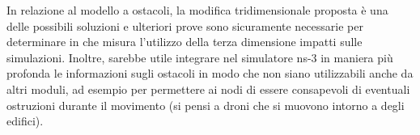 In relazione al modello a ostacoli, la modifica tridimensionale proposta è una delle
possibili soluzioni e ulteriori prove sono sicuramente necessarie per determinare
in che misura l'utilizzo della terza dimensione impatti sulle simulazioni.
Inoltre, sarebbe utile integrare nel simulatore ns-3 in maniera più profonda le informazioni sugli ostacoli
in modo che non siano utilizzabili anche da altri moduli,
ad esempio per permettere ai nodi di essere consapevoli di eventuali ostruzioni durante il movimento
(si pensi a droni che si muovono intorno a degli edifici).
